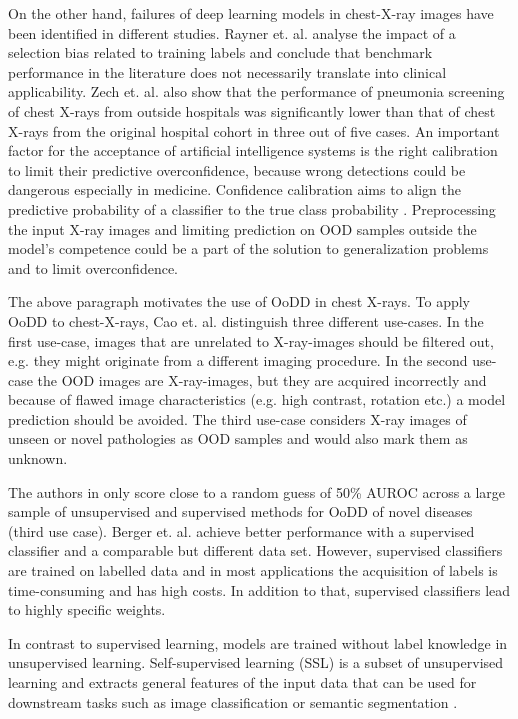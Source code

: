 On the other hand, failures of deep learning models in chest-X-ray images have been identified in different studies.
Rayner et. al. \citep{Rayner2019} analyse the impact of a selection bias related to training labels and conclude that benchmark performance in the literature does not necessarily translate into clinical applicability.
Zech et. al. \citep{Zech2018} also show that the performance of pneumonia screening of chest X-rays from outside hospitals was significantly lower than that of chest X-rays from the original hospital cohort in three out of five cases.
An important factor for the acceptance of artificial intelligence systems is the right calibration to limit their predictive overconfidence, because wrong detections could be dangerous especially in medicine.
Confidence calibration aims to align the predictive probability of a classifier to the true class probability \citep{Guo2017}.
Preprocessing the input X-ray images and limiting prediction on OOD samples outside the model's competence could be a part of the solution to generalization problems and to limit overconfidence.
\par
The above paragraph motivates the use of OoDD in chest X-rays.
To apply OoDD to chest-X-rays, Cao et. al. \citep{Cao2020} distinguish three different use-cases.
In the first use-case, images that are unrelated to X-ray-images should be filtered out, e.g. they might originate from a different imaging procedure.
In the second use-case the OOD images are X-ray-images, but they are acquired incorrectly and because of flawed image characteristics (e.g. high contrast, rotation etc.) a model prediction should be avoided.
The third use-case considers X-ray images of unseen or novel pathologies as OOD samples and would also mark them as unknown.
\par
The authors in \citep{Cao2020} only score close to a random guess of 50\% AUROC across a large sample of unsupervised and supervised methods for OoDD of novel diseases (third use case).
Berger et. al. \citep{Berger2021} achieve better performance with a supervised classifier and a comparable but different data set.
However, supervised classifiers are trained on labelled data and in most applications the acquisition of labels is time-consuming and has high costs.
In addition to that, supervised classifiers lead to highly specific weights.
\par
In contrast to supervised learning, models are trained without label knowledge in unsupervised learning.
Self-supervised learning (SSL) is a subset of unsupervised learning and extracts general features of the input data that can be used for downstream tasks such as image classification or semantic segmentation \citep{Jing2019}.
